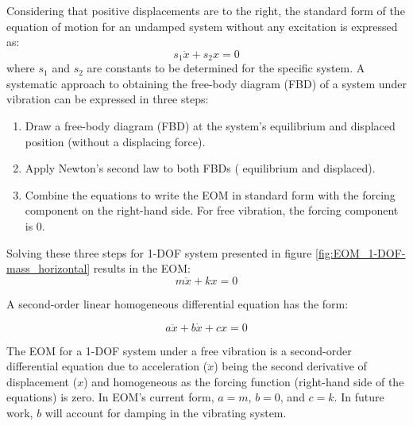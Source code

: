 \documentclass[12pt,letter]{article}
\begin{document}
		Considering that positive displacements are to the right, the standard form of the equation of motion for an undamped system without any excitation is expressed as:  
		\begin{equation}
			s_1 \ddot{x} + s_2 x = 0
		\end{equation}			
		where $s_1$ and $s_2$ are constants to be determined for the specific system. A systematic approach to obtaining the free-body diagram (FBD) of a system under vibration can be expressed in three steps:
		\begin{enumerate}
			\item Draw a free-body diagram (FBD) at the system's equilibrium and displaced position (without a displacing force).
			\item Apply Newton's second law to both FBDs ( equilibrium and displaced).
			\item Combine the equations to write the EOM in standard form with the forcing component on the right-hand side. For free vibration, the forcing component is 0. 
		\end{enumerate}
			
		Solving these three steps for 1-DOF system presented in figure \ref{fig:EOM_1-DOF-mass_horizontal} results in the EOM:
		\begin{equation}
			m \ddot{x} + k x = 0
		\end{equation}

		\begin{review}
			A second-order linear homogeneous differential equation has the form:
			
			\begin{equation}
			 a \ddot{x} + b \dot{x} + cx = 0
			\end{equation}
		
			\noindent The EOM for a 1-DOF system under a free vibration is a second-order differential equation due to acceleration ($\ddot{x}$) being the second derivative of displacement ($x$) and homogeneous as the forcing function (right-hand side of the equations) is zero. In EOM's current form, $a=m$, $b=0$,  and $c=k$. In future work, $b$ will account for damping in the vibrating system.     
		\end{review}
\end{document}
